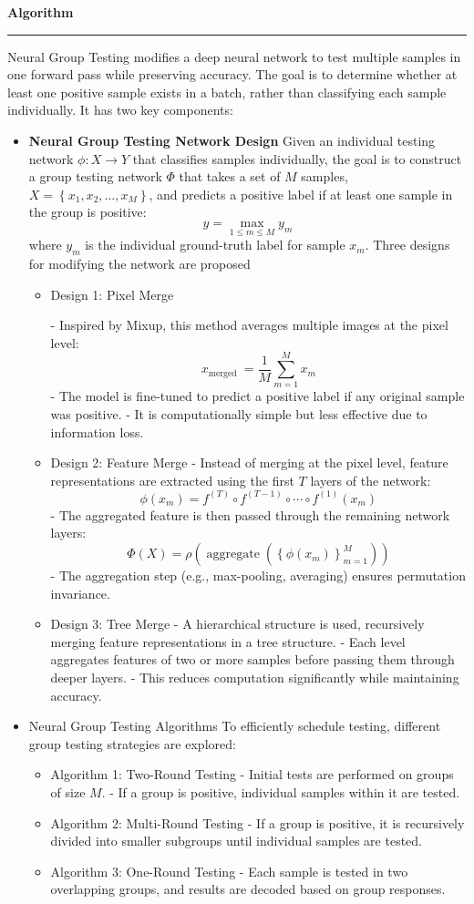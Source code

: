 \documentclass[a4paper,12pt]{article}
\newenvironment{solution}[2][]{%
    \begin{mdframed}[linecolor=blue!70!black, linewidth=2pt, roundcorner=10pt, backgroundcolor=yellow!10!white, skipabove=12pt, skipbelow=12pt]%
        \textbf{\large #2}
        \par\noindent\rule{\textwidth}{0.4pt}
}{
    \end{mdframed}
}
\begin{document}
\begin{solution}{Algorithm}
  Neural Group Testing modifies a deep neural network to test multiple samples in one forward pass while preserving accuracy. The goal is to determine whether at least one positive sample exists in a batch, rather than classifying each sample individually. It has two key components:
  \begin{itemize}
    \item {\bf Neural Group Testing Network Design}
    Given an individual testing network $\phi: X \rightarrow Y$ that classifies samples individually, the goal is to construct a group testing network $\Phi$ that takes a set of $M$ samples, $X=\left\{x_1, x_2, \ldots, x_M\right\}$, and predicts a positive label if at least one sample in the group is positive:
$$
y=\max _{1 \leq m \leq M} y_m
$$
where $y_m$ is the individual ground-truth label for sample $x_m$.
Three designs for modifying the network are proposed
\begin{itemize}
  \item Design 1: Pixel Merge
  
  - Inspired by Mixup, this method averages multiple images at the pixel level:
  $$
  x_{\text {merged }}=\frac{1}{M} \sum_{m=1}^M x_m
  $$
  - The model is fine-tuned to predict a positive label if any original sample was positive.
  - It is computationally simple but less effective due to information loss.
  \item Design 2: Feature Merge
  - Instead of merging at the pixel level, feature representations are extracted using the first $T$ layers of the network:
  $$
  \phi\left(x_m\right)=f^{(T)} \circ f^{(T-1)} \circ \cdots \circ f^{(1)}\left(x_m\right)
  $$
  - The aggregated feature is then passed through the remaining network layers:
  $$
  \Phi(X)=\rho\left(\operatorname{aggregate}\left(\left\{\phi\left(x_m\right)\right\}_{m=1}^M\right)\right)
  $$
  - The aggregation step (e.g., max-pooling, averaging) ensures permutation invariance.
  \item Design 3: Tree Merge
  - A hierarchical structure is used, recursively merging feature representations in a tree structure.
  - Each level aggregates features of two or more samples before passing them through deeper layers.
  - This reduces computation significantly while maintaining accuracy.
\end{itemize}
\item Neural Group Testing Algorithms
To efficiently schedule testing, different group testing strategies are explored:
\begin{itemize}
  \item Algorithm 1: Two-Round Testing
  - Initial tests are performed on groups of size $M$.
  - If a group is positive, individual samples within it are tested.
  \item Algorithm 2: Multi-Round Testing
  - If a group is positive, it is recursively divided into smaller subgroups until individual samples are tested.
  \item Algorithm 3: One-Round Testing
  - Each sample is tested in two overlapping groups, and results are decoded based on group responses. 
\end{itemize} 
  \end{itemize}
\end{solution}
\end{document}

